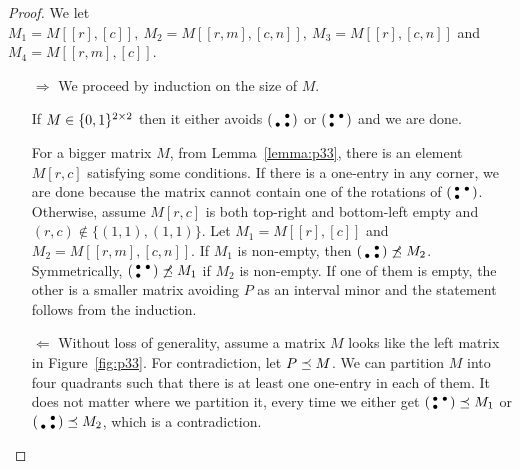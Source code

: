 \begin{proof}
We let $M_1=M[[r],[c]],\ M_2=M[[r,m],[c,n]],\ M_3=M[[r],[c,n]]$ and $M_4=M[[r,m],[c]]$.
\begin{itemize}
	\item[$\Rightarrow$] We proceed by induction on the size of $M$.

If $M\in\{0,1\}^{2\times2}$ then it either avoids $\left(\begin{smallmatrix} &\bullet\\\bullet&\bullet\end{smallmatrix}\right)$ or $\left(\begin{smallmatrix}\bullet&\bullet\\\bullet& \end{smallmatrix}\right)$ and we are done.

For a bigger matrix $M$, from Lemma~\ref{lemma:p33}, there is an element $M[r,c]$ satisfying some conditions. If there is a one-entry in any corner, we are done because the matrix cannot contain one of the rotations of $\left(\begin{smallmatrix}\bullet&\bullet\\\bullet& \end{smallmatrix}\right)$. Otherwise, assume $M[r,c]$ is both top-right and bottom-left empty and $(r,c)\not\in\{(1,1),(1,1)\}$. Let $M_1=M[[r],[c]]$ and $M_2=M[[r,m],[c,n]]$. If $M_1$ is non-empty, then $\left(\begin{smallmatrix} &\bullet\\\bullet&\bullet\end{smallmatrix}\right)\not\preceq M_2$. Symmetrically, $\left(\begin{smallmatrix}\bullet&\bullet\\\bullet& \end{smallmatrix}\right)\not\preceq M_1$ if $M_2$ is non-empty. If one of them is empty, the other is a smaller matrix avoiding $P$ as an interval minor and the statement follows from the induction.
	\item[$\Leftarrow$] Without loss of generality, assume a matrix $M$ looks like the left matrix in Figure~\ref{fig:p33}. For contradiction, let $P\preceq M$. We can partition $M$ into four quadrants such that there is at least one one-entry in each of them. It does not matter where we partition it, every time we either get $\left(\begin{smallmatrix}\bullet&\bullet\\\bullet& \end{smallmatrix}\right)\preceq M_1$ or $\left(\begin{smallmatrix} &\bullet\\\bullet&\bullet\end{smallmatrix}\right)\preceq M_2$, which is a contradiction.
\end{itemize}
\end{proof}

